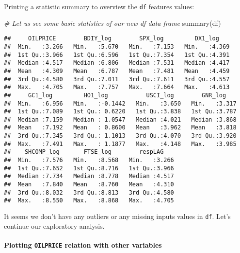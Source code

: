 \documentclass[
]{article}
\newenvironment{Shaded}{\begin{snugshade}}{\end{snugshade}}
\newcommand{\CommentTok}[1]{\textcolor[rgb]{0.56,0.35,0.01}{\textit{#1}}}
\newcommand{\FunctionTok}[1]{\textcolor[rgb]{0.00,0.00,0.00}{#1}}
\newcommand{\NormalTok}[1]{#1}
\begin{document}
Printing a statistic summary to overview the \texttt{df} features
values:

\begin{Shaded}
\begin{Highlighting}[]
\CommentTok{\# Let us see some basic statistics of our new \textquotesingle{}df\textquotesingle{} data frame}
\FunctionTok{summary}\NormalTok{(df)}
\end{Highlighting}
\end{Shaded}

\begin{verbatim}
##     OILPRICE        BDIY_log        SPX_log         DX1_log     
##  Min.   :3.266   Min.   :5.670   Min.   :7.153   Min.   :4.369  
##  1st Qu.:3.966   1st Qu.:6.596   1st Qu.:7.354   1st Qu.:4.391  
##  Median :4.517   Median :6.806   Median :7.531   Median :4.417  
##  Mean   :4.309   Mean   :6.787   Mean   :7.481   Mean   :4.459  
##  3rd Qu.:4.580   3rd Qu.:7.011   3rd Qu.:7.611   3rd Qu.:4.557  
##  Max.   :4.705   Max.   :7.757   Max.   :7.664   Max.   :4.613  
##     GC1_log         HO1_log           USCI_log        GNR_log     
##  Min.   :6.956   Min.   :-0.1442   Min.   :3.650   Min.   :3.317  
##  1st Qu.:7.089   1st Qu.: 0.6220   1st Qu.:3.838   1st Qu.:3.787  
##  Median :7.159   Median : 1.0547   Median :4.021   Median :3.868  
##  Mean   :7.192   Mean   : 0.8600   Mean   :3.962   Mean   :3.818  
##  3rd Qu.:7.345   3rd Qu.: 1.1013   3rd Qu.:4.070   3rd Qu.:3.920  
##  Max.   :7.491   Max.   : 1.1877   Max.   :4.148   Max.   :3.985  
##    SHCOMP_log       FTSE_log        respLAG     
##  Min.   :7.576   Min.   :8.568   Min.   :3.266  
##  1st Qu.:7.652   1st Qu.:8.716   1st Qu.:3.966  
##  Median :7.734   Median :8.778   Median :4.517  
##  Mean   :7.840   Mean   :8.760   Mean   :4.310  
##  3rd Qu.:8.032   3rd Qu.:8.813   3rd Qu.:4.580  
##  Max.   :8.550   Max.   :8.868   Max.   :4.705
\end{verbatim}

It seems we don't have any outliers or any missing inputs values in
\texttt{df}. Let's continue our exploratory analysis.

\hypertarget{plotting-oilprice-relation-with-other-variables}{%
\paragraph{\texorpdfstring{Plotting \texttt{OILPRICE} relation with
other
variables}{Plotting OILPRICE relation with other variables}}\label{plotting-oilprice-relation-with-other-variables}}
\end{document}
